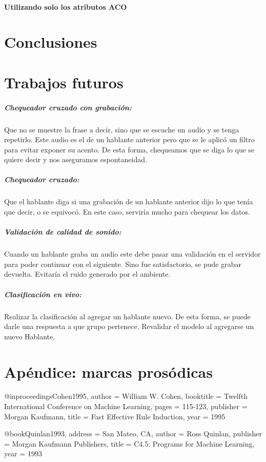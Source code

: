 \documentclass[11pt,a4paper,twoside]{tesis}
\begin{document}
\subsubsection{Utilizando solo los atributos ACO}

\chapter{Conclusiones}
\chapter{Trabajos futuros}

\paragraph*{Chequeador cruzado con grabación:} Que no se muestre la frase a decir, sino que se escuche un audio y se tenga repetirlo. Este audio es el de un hablante anterior pero que se le aplicó un filtro para evitar exponer su acento. De esta forma, chequeamos que se diga lo que se quiere decir y nos aseguramos espontaneidad.

\paragraph*{Chequeador cruzado:} Que el hablante diga si una grabación de un hablante anterior dijo lo que tenía que decir, o se equivocó. En este caso, serviría mucho para chequear los datos. 

\paragraph*{Validación de calidad de sonido:} Cuando un hablante graba un audio este debe pasar una validación en el servidor para poder continuar con el siguiente. Sino fue satisfactorio, se pude grabar devuelta. Evitaría el ruido generado por el ambiente. 

\paragraph*{Clasificación en vivo:} Realizar la clasificación al agregar un hablante nuevo. De esta forma, se puede darle una respuesta a que grupo pertenece. Revalidar el modelo al agregarse un nuevo Hablante. 

\chapter{Apéndice: marcas prosódicas}

\backmatter

 
 @inproceedings{Cohen1995,
    author = {William W. Cohen},
    booktitle = {Twelfth International Conference on Machine Learning},
    pages = {115-123},
    publisher = {Morgan Kaufmann},
    title = {Fast Effective Rule Induction},
    year = {1995}
 } 
 
 @book{Quinlan1993,
    address = {San Mateo, CA},
    author = {Ross Quinlan},
    publisher = {Morgan Kaufmann Publishers},
    title = {C4.5: Programs for Machine Learning},
    year = {1993}
 }
 
\end{document}
